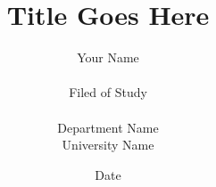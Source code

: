 \documentclass[a4paper]{report}
\begin{document}
\setlength{\TPHorizModule}{200mm} 
\setlength{\TPVertModule}{100mm} 
\textblockorigin{61mm}{19mm}
\onehalfspace{}
\providecommand{\OT}[1]{\operatorname{\Theta}\bigl(#1\bigr)}
\providecommand{\OOm}[1]{\operatorname{\Omega}\bigl(#1\bigr)}

\title{ Title Goes Here}
\author{Your Name \\
\\
Filed of Study\\
\\
Department Name\\
University Name
}
\date{Date}

\maketitle
 
\setcounter{page}{3}


\tableofcontents
\listoffigures
\listoftables











\appendix


% 


\end{document}

